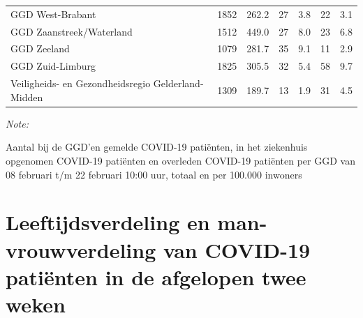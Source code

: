 \documentclass[
  english,
  man,floatsintext]{apa6}
\begin{document}
\begin{table}[H]
\begin{threeparttable}
\begin{tabular}{lrrrrrr}
GGD West-Brabant & 1852 & 262.2 & 27 & 3.8 & 22 & 3.1\\
GGD Zaanstreek/Waterland & 1512 & 449.0 & 27 & 8.0 & 23 & 6.8\\
GGD Zeeland & 1079 & 281.7 & 35 & 9.1 & 11 & 2.9\\
GGD Zuid-Limburg & 1825 & 305.5 & 32 & 5.4 & 58 & 9.7\\
Veiligheids- en Gezondheidsregio Gelderland-Midden & 1309 & 189.7 & 13 & 1.9 & 31 & 4.5\\
\bottomrule
\end{tabular}
\begin{tablenotes}
\item \textit{Note: } 
\item Aantal bij de GGD’en gemelde COVID-19 patiënten, in het ziekenhuis opgenomen COVID-19 patiënten en overleden COVID-19 patiënten per GGD van 08 februari t/m 22 februari 10:00 uur, totaal en per 100.000 inwoners
\end{tablenotes}
\end{threeparttable}
\endgroup{}
\end{table}

\newpage

\hypertarget{leeftijdsverdeling-en-man-vrouwverdeling-van-covid-19-patiuxebnten-in-de-afgelopen-twee-weken}{%
\section{Leeftijdsverdeling en man-vrouwverdeling van COVID-19 patiënten in de afgelopen twee weken}\label{leeftijdsverdeling-en-man-vrouwverdeling-van-covid-19-patiuxebnten-in-de-afgelopen-twee-weken}}
\end{document}
